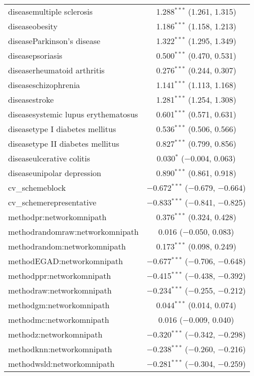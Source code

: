 \begin{table}[!htbp]
\begin{tabular}{@{\extracolsep{5pt}}lc}
  diseasemultiple sclerosis & 1.288$^{***}$ (1.261, 1.315) \\ 
  diseaseobesity & 1.186$^{***}$ (1.158, 1.213) \\ 
  diseaseParkinson's disease & 1.322$^{***}$ (1.295, 1.349) \\ 
  diseasepsoriasis & 0.500$^{***}$ (0.470, 0.531) \\ 
  diseaserheumatoid arthritis & 0.276$^{***}$ (0.244, 0.307) \\ 
  diseaseschizophrenia & 1.141$^{***}$ (1.113, 1.168) \\ 
  diseasestroke & 1.281$^{***}$ (1.254, 1.308) \\ 
  diseasesystemic lupus erythematosus & 0.601$^{***}$ (0.571, 0.631) \\ 
  diseasetype I diabetes mellitus & 0.536$^{***}$ (0.506, 0.566) \\ 
  diseasetype II diabetes mellitus & 0.827$^{***}$ (0.799, 0.856) \\ 
  diseaseulcerative colitis & 0.030$^{*}$ ($-$0.004, 0.063) \\ 
  diseaseunipolar depression & 0.890$^{***}$ (0.861, 0.918) \\ 
  cv\_schemeblock & $-$0.672$^{***}$ ($-$0.679, $-$0.664) \\ 
  cv\_schemerepresentative & $-$0.833$^{***}$ ($-$0.841, $-$0.825) \\ 
  methodpr:networkomnipath & 0.376$^{***}$ (0.324, 0.428) \\ 
  methodrandomraw:networkomnipath & 0.016 ($-$0.050, 0.083) \\ 
  methodrandom:networkomnipath & 0.173$^{***}$ (0.098, 0.249) \\ 
  methodEGAD:networkomnipath & $-$0.677$^{***}$ ($-$0.706, $-$0.648) \\ 
  methodppr:networkomnipath & $-$0.415$^{***}$ ($-$0.438, $-$0.392) \\ 
  methodraw:networkomnipath & $-$0.234$^{***}$ ($-$0.255, $-$0.212) \\ 
  methodgm:networkomnipath & 0.044$^{***}$ (0.014, 0.074) \\ 
  methodmc:networkomnipath & 0.016 ($-$0.009, 0.040) \\ 
  methodz:networkomnipath & $-$0.320$^{***}$ ($-$0.342, $-$0.298) \\ 
  methodknn:networkomnipath & $-$0.238$^{***}$ ($-$0.260, $-$0.216) \\ 
  methodwsld:networkomnipath & $-$0.281$^{***}$ ($-$0.304, $-$0.259) \\ 

\end{tabular}
\end{table}

